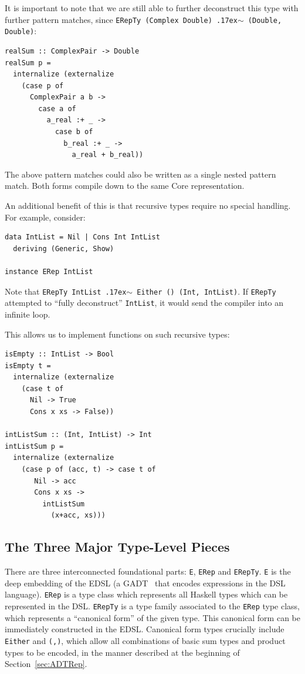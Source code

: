\documentclass[runningheads, a4paper]{llncs}
\newcommand{\typeeq}{\raise.17ex\hbox{$\scriptstyle\mathtt{\sim}$}\,\;}
\newcommand{\ttt}{\texttt}
\begin{document}
It is important to note that we are still able to further deconstruct this type
with further pattern matches, since \ttt{ERepTy (Complex Double) \typeeq (Double, Double)}:

\begin{lstlisting}
realSum :: ComplexPair -> Double
realSum p =
  internalize (externalize
    (case p of
      ComplexPair a b ->
        case a of
          a_real :+ _ ->
            case b of
              b_real :+ _ ->
                a_real + b_real))
\end{lstlisting}

\noindent The above pattern matches could also be written as a single nested pattern
match. Both forms compile down to the same Core representation.

An additional benefit of this is that recursive types require no special handling. For
example, consider:

\begin{lstlisting}
data IntList = Nil | Cons Int IntList
  deriving (Generic, Show)

instance ERep IntList
\end{lstlisting}

\noindent Note that \ttt{ERepTy IntList \typeeq Either () (Int, IntList)}. If \ttt{ERepTy}
attempted to ``fully deconstruct'' \ttt{IntList}, it would send the compiler
into an infinite loop.

This allows us to implement functions on such recursive types:

\begin{lstlisting}
isEmpty :: IntList -> Bool
isEmpty t =
  internalize (externalize
    (case t of
      Nil -> True
      Cons x xs -> False))

intListSum :: (Int, IntList) -> Int
intListSum p =
  internalize (externalize
    (case p of (acc, t) -> case t of
       Nil -> acc
       Cons x xs ->
         intListSum
           (x+acc, xs)))
\end{lstlisting}

\subsection{The Three Major Type-Level Pieces}

There are three interconnected foundational parts: \ttt{E}, \ttt{ERep} and
\ttt{ERepTy}. \ttt{E} is the deep embedding of the EDSL (a GADT~\cite{Vytiniotis:2006:Simple} that encodes
expressions in the DSL language). \ttt{ERep} is a type class which represents
all Haskell types which can be represented in the DSL. \ttt{ERepTy} is a type
family associated to the \ttt{ERep} type class, which represents a ``canonical form''
of the given type. This canonical form can be immediately constructed in the EDSL.
Canonical form types crucially include \ttt{Either} and \ttt{(,)}, which
allow all combinations of basic sum types and product types to be encoded, in the
manner described at the beginning of Section~\ref{sec:ADTRep}.
\end{document}
